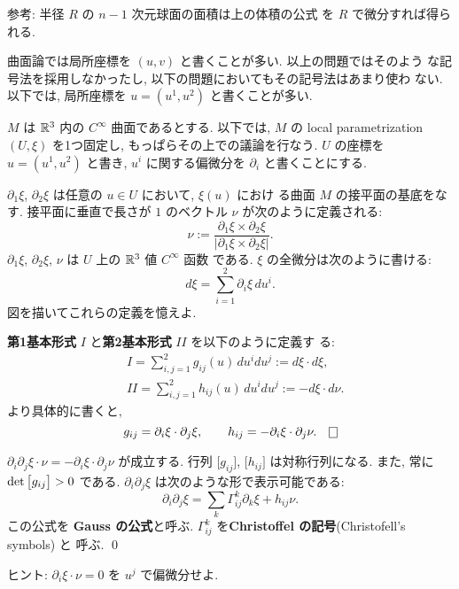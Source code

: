 \documentclass[12pt,twoside]{jarticle}
\def\II{I\!I}
\def\R{{\Bbb R}} %
\def\det{\mathop{\text{\rm det}}\nolimits}          %
\def\rd{\partial}
\begin{document}
\smallskip

\noindent 参考: 半径 $R$ の $n-1$ 次元球面の面積は上の体積の公式%
を $R$ で微分すれば得られる.

\medskip

曲面論では局所座標を $(u,v)$ と書くことが多い. 以上の問題ではそのよう
な記号法を採用しなかったし, 以下の問題においてもその記号法はあまり使わ
ない. 以下では, 局所座標を $u = (u^1, u^2)$ と書くことが多い. 

$M$ は $\R^3$ 内の $C^\infty$ 曲面であるとする. 以下では, $M$ の local
parametrization $(U,\xi)$ を1つ固定し, もっぱらその上での議論を行なう.
$U$ の座標を $u = (u^1, u^2)$ と書き, $u^i$ に関する偏微分を $\rd_i$ %
と書くことにする.

$\rd_1 \xi$, $\rd_2 \xi$ は任意の $u \in U$ において, $\xi(u)$ におけ
る曲面 $M$ の接平面の基底をなす. 接平面に垂直で長さが $1$ のベクトル %
$\nu$ が次のように定義される:
\[
  \nu
  := \frac{\rd_1\xi \times \rd_2\xi}{|\rd_1\xi \times \rd_2\xi|}.
\]
$\rd_1 \xi$, $\rd_2 \xi$, $\nu$ は $U$ 上の $\R^3$ 値 $C^\infty$ 函数
である. $\xi$ の全微分は次のように書ける:
\[
  d\xi = \sum_{i=1}^2  \rd_i\xi \, du^i.
\]
図を描いてこれらの定義を憶えよ.

\begin{Definition}
  {\bf 第1基本形式} $I$ と{\bf 第2基本形式} $\II$ を以下のように定義す
  る:
  \begin{align*}
    &
    I  = \sum_{i,j=1}^2 g_{ij}(u) \, du^i du^j
    := d\xi \cdot d\xi,
    \\
    &
    \II = \sum_{i,j=1}^2 h_{ij}(u) \, du^i du^j
    := - d\xi \cdot d\nu.
  \end{align*}
  より具体的に書くと, 
  \[
    g_{ij} = \rd_i \xi \cdot \rd_j \xi,
    \qquad
    h_{ij} = - \rd_i \xi \cdot \rd_j \nu.
  \qed
  \]
\end{Definition}

\begin{question}\label{q:Gauss-Chris}
  $\rd_i\rd_j\xi \cdot \nu = - \rd_i\xi \cdot \rd_j\nu$ が成立する. 
  行列 $\big[g_{ij}\big]$, $\big[h_{ij}\big]$ は対称行列になる. 
  また, 常に $\det\big[g_{ij}\big] > 0$ である. 
  $\rd_i\rd_j\xi$ は次のような形で表示可能である:
  \[
    \rd_i\rd_j\xi
    = \sum_k \Gamma^k_{ij} \rd_k\xi + h_{ij} \nu.
  \] %
  この公式を {\bf Gauss の公式}と呼ぶ.  %
  $\Gamma^k_{ij}$ を{\bf Christoffel の記号}(Christofell's symbols) と
  呼ぶ.  \qed
\end{question}

\noindent ヒント: $\rd_i\xi \cdot \nu = 0$ を $u^j$ で偏微分せよ.
\end{document}
